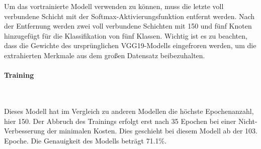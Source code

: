 Um das vortrainierte Modell verwenden zu können, muss die letzte voll verbundene Schicht mit der Softmax-Aktivierungsfunktion entfernt werden. Nach der Entfernung werden zwei voll verbundene Schichten mit 150 und fünf Knoten hinzugefügt für die Klassifikation von fünf Klassen. Wichtig ist es zu beachten, dass die Gewichte des ursprünglichen VGG19-Modells eingefroren werden, um die extrahierten Merkmale aus dem großen Datensatz beibezuhalten. 


\paragraph{Training}
~\newline


Dieses Modell hat im Vergleich zu anderen Modellen die höchste Epochenanzahl, hier 150. Der Abbruch des Trainings erfolgt erst nach 35 Epochen bei einer Nicht-Verbesserung der minimalen Kosten. Dies geschieht bei diesem Modell ab der 103. Epoche. Die Genauigkeit des Modells beträgt 71.1\%. 



